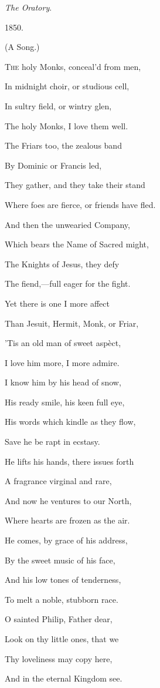 \emph{The Oratory}.

1850.


(A Song.)

T\textsc{he} holy Monks, conceal'd from men,

In midnight choir, or studious cell,

In sultry field, or wintry glen,

The holy Monks, I love them well.

The Friars too, the zealous band

By Dominic or Francis led,

They gather, and they take their stand

Where foes are fierce, or friends have
fled.

And then the unwearied Company,

Which bears the Name of Sacred might,

The Knights of Jesus, they defy

The fiend,—full eager for the fight.

Yet there is one I more affect

Than Jesuit, Hermit, Monk, or Friar,

'Tis an old man of sweet aspèct,

I love him more, I more admire. 

I know him by his head of snow,

His ready smile, his keen full eye,

His words which kindle as they flow,

Save he be rapt in ecstasy.

He lifts his hands, there issues forth

A fragrance virginal and rare,

And now he ventures to our North,

Where hearts are frozen as the air.

He comes, by grace of his address,

By the sweet music of his face,

And his low tones of tenderness,

To melt a noble, stubborn race.

O sainted Philip, Father dear,

Look on thy little ones, that we

Thy loveliness may copy here,

And in the eternal Kingdom see.

